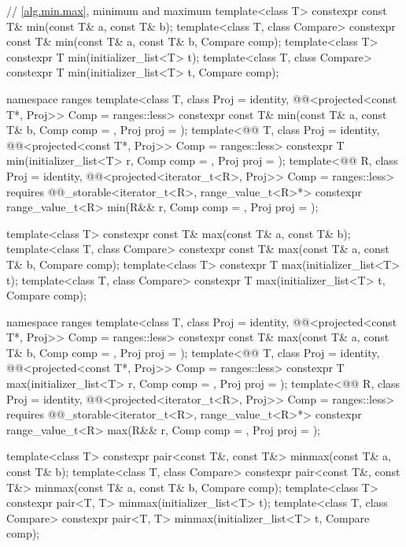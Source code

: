 \begin{codeblock}
{  // \ref{alg.min.max}, minimum and maximum
  template<class T> constexpr const T& min(const T& a, const T& b);
  template<class T, class Compare>
    constexpr const T& min(const T& a, const T& b, Compare comp);
  template<class T>
    constexpr T min(initializer_list<T> t);
  template<class T, class Compare>
    constexpr T min(initializer_list<T> t, Compare comp);

  namespace ranges {
    template<class T, class Proj = identity,
             @@<projected<const T*, Proj>> Comp = ranges::less>
      constexpr const T& min(const T& a, const T& b, Comp comp = {}, Proj proj = {});
    template<@@ T, class Proj = identity,
             @@<projected<const T*, Proj>> Comp = ranges::less>
      constexpr T min(initializer_list<T> r, Comp comp = {}, Proj proj = {});
    template<@@ R, class Proj = identity,
             @@<projected<iterator_t<R>, Proj>> Comp = ranges::less>
      requires @@_storable<iterator_t<R>, range_value_t<R>*>
      constexpr range_value_t<R>
        min(R&& r, Comp comp = {}, Proj proj = {});
  }

  template<class T> constexpr const T& max(const T& a, const T& b);
  template<class T, class Compare>
    constexpr const T& max(const T& a, const T& b, Compare comp);
  template<class T>
    constexpr T max(initializer_list<T> t);
  template<class T, class Compare>
    constexpr T max(initializer_list<T> t, Compare comp);

  namespace ranges {
    template<class T, class Proj = identity,
             @@<projected<const T*, Proj>> Comp = ranges::less>
      constexpr const T& max(const T& a, const T& b, Comp comp = {}, Proj proj = {});
    template<@@ T, class Proj = identity,
             @@<projected<const T*, Proj>> Comp = ranges::less>
      constexpr T max(initializer_list<T> r, Comp comp = {}, Proj proj = {});
    template<@@ R, class Proj = identity,
             @@<projected<iterator_t<R>, Proj>> Comp = ranges::less>
      requires @@_storable<iterator_t<R>, range_value_t<R>*>
      constexpr range_value_t<R>
        max(R&& r, Comp comp = {}, Proj proj = {});
  }

  template<class T> constexpr pair<const T&, const T&> minmax(const T& a, const T& b);
  template<class T, class Compare>
    constexpr pair<const T&, const T&> minmax(const T& a, const T& b, Compare comp);
  template<class T>
    constexpr pair<T, T> minmax(initializer_list<T> t);
  template<class T, class Compare>
    constexpr pair<T, T> minmax(initializer_list<T> t, Compare comp);

}
\end{codeblock}

